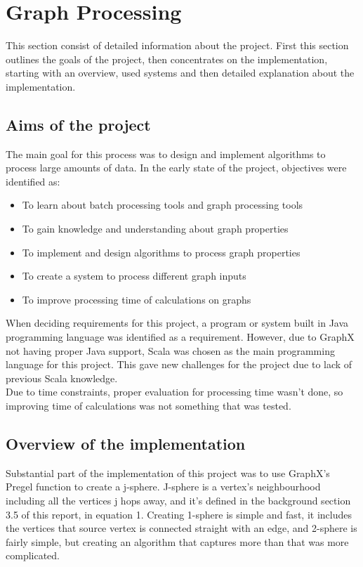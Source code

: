 \documentclass{article}
\theoremstyle{definition}
\begin{document}
\section{Graph Processing}
This section consist of detailed information about the project. First this section outlines the goals of the project, then concentrates on the implementation, starting with an overview, used systems and then detailed explanation about the implementation. 

\subsection{Aims of the project}
The main goal for this process was to design and implement algorithms to process large amounts of data. In the early state of the project, objectives were identified as: 
\begin{itemize}
\item To learn about batch processing tools and graph processing tools
\item To gain knowledge and understanding about graph properties
\item To implement and design algorithms to process graph properties
\item To create a system to process different graph inputs
\item To improve processing time of calculations on graphs
\end{itemize}

When deciding requirements for this project, a program or system built in Java programming language was identified as a requirement. However, due to GraphX not having proper Java support, Scala was chosen as the main programming language for this project. This gave new challenges for the project due to lack of previous Scala knowledge. \\

Due to time constraints, proper evaluation for processing time wasn't done, so improving time of calculations was not something that was tested.  

\subsection{Overview of the implementation}
Substantial part of the implementation of this project was to use GraphX's Pregel function to create a j-sphere. J-sphere is a vertex's neighbourhood including all the vertices j hops away, and it's defined in the background section 3.5 of this report, in equation 1. Creating 1-sphere is simple and fast, it includes the vertices that source vertex is connected straight with an edge, and 2-sphere is fairly simple, but creating an algorithm that captures more than that was more complicated. 
\end{document}
